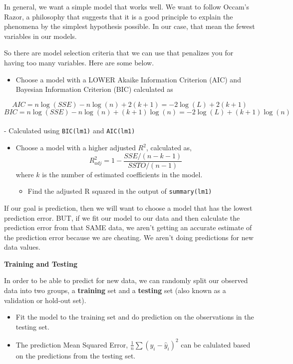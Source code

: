 \documentclass[]{book}
\providecommand{\tightlist}{%
  \setlength{\itemsep}{0pt}\setlength{\parskip}{0pt}}
\begin{document}
In general, we want a simple model that works well. We want to follow Occam's Razor, a philosophy that suggests that it is a good principle to explain the phenomena by the simplest hypothesis possible. In our case, that mean the fewest variables in our models.

So there are model selection criteria that we can use that penalizes you for having too many variables. Here are some below.

\begin{itemize}
\tightlist
\item
  Choose a model with a LOWER Akaike Information Criterion (AIC) and Bayesian Information Criterion (BIC) calculated as
\end{itemize}

\[AIC = n\log(SSE) - n\log(n) + 2(k+1) = -2\log(L) + 2(k+1)\]
\[BIC = n\log(SSE) -n\log(n) + (k+1)\log(n)= -2\log(L) + (k+1)\log(n)\]\\
- Calculated using \texttt{BIC(lm1)} and \texttt{AIC(lm1)}

\begin{itemize}
\tightlist
\item
  Choose a model with a higher adjusted \(R^2\), calculated as,
  \[R^2_{adj} = 1 - \frac{SSE/(n-k-1)}{SSTO/(n-1)}\]
  where \(k\) is the number of estimated coefficients in the model.

  \begin{itemize}
  \tightlist
  \item
    Find the adjusted R squared in the output of \texttt{summary(lm1)}
  \end{itemize}
\end{itemize}

If our goal is prediction, then we will want to choose a model that has the lowest prediction error. BUT, if we fit our model to our data and then calculate the prediction error from that SAME data, we aren't getting an accurate estimate of the prediction error because we are cheating. We aren't doing predictions for new data values.

\textbf{Training and Testing}

In order to be able to predict for new data, we can randomly split our observed data into two groups, a \textbf{training} set and a \textbf{testing} set (also known as a validation or hold-out set).

\begin{itemize}
\tightlist
\item
  Fit the model to the training set and do prediction on the observations in the testing set.
\item
  The prediction Mean Squared Error, \(\frac{1}{n}\sum(y_i - \hat{y}_i)^2\) can be calulated based on the predictions from the testing set.
\end{itemize}
\end{document}
